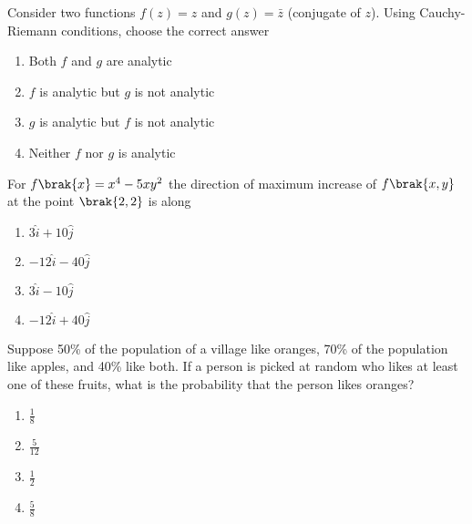 \iffalse
\chapter{2012}
\author{EE24BTECH11059}
\section{xe}
\fi
	\item{
		Consider two functions
		\( f(z) = z \)
		and
		\( g(z) = \bar{z} \)
		(conjugate of \( z \)). Using Cauchy-Riemann conditions, choose the correct answer
		
		\begin{multicols}{2}
			\begin{enumerate}
				\item Both \(f\) and \(g\) are analytic
				\item \(f\) is analytic but \(g\) is not analytic
				\item \(g\) is analytic but \(f\) is not analytic
				\item Neither \(f\) nor \(g\) is analytic 
			\end{enumerate}
		\end{multicols}
	}
   	\item{
    	For $f\brak{x} = x^4 - 5xy^2 $ the direction of maximum increase of \( f\brak{x,y} \) at the point \( \brak{2,2} \) is along \text{  }\hfill
    	
    	\begin{multicols}{4}
    		\begin{enumerate}
    			\item \(3\hat{i} + 10\hat{j}\)
    			
    			\item \(-12\hat{i} - 40\hat{j}\)
    			
    			\item \(3\hat{i} - 10\hat{j}\)
    			
    			\item \(-12\hat{i} + 40\hat{j}\)
    		\end{enumerate}
    	\end{multicols}
    }
    \item{
            Suppose 50\% of the population of a village like oranges, 70\% of the population like apples, and 40\% like both. If a person is picked at random who likes at least one of these fruits, what is the probability that the person likes oranges?
                
            \begin{multicols}{4}
                \begin{enumerate}
                	\item \( \frac{1}{8} \)
                	\item \( \frac{5}{12} \)
                	\item \( \frac{1}{2} \)
                	\item \( \frac{5}{8} \)
                \end{enumerate}
            \end{multicols}
        }
